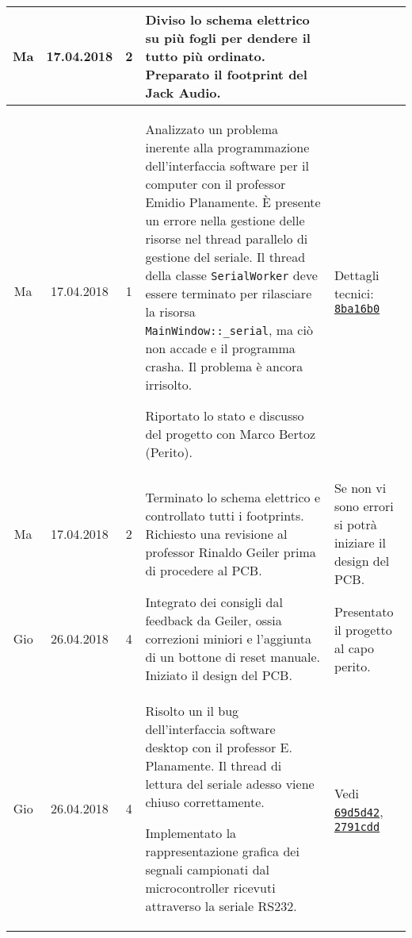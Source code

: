 \documentclass[a4paper]{article}
\newcommand{\journalentry}[5]{%
    #1 & #2 & #3 & #4 & #5 \\\hline
}
\begin{document}
\begin{tabularx}{\textwidth}{| c | c | c | p{} | X |}
        \journalentry{Ma}{17.04.2018}{2}{
            Diviso lo schema elettrico su pi\`u fogli per dendere il tutto pi\`u
            ordinato. Preparato il footprint del Jack Audio.
        }{}

        \journalentry{Ma}{17.04.2018}{1}{
            Analizzato un problema inerente alla programmazione dell'interfaccia
            software per il computer con il professor Emidio Planamente.
            \`E presente un errore nella gestione delle risorse nel thread
            parallelo di gestione del seriale. Il thread della classe 
            \texttt{SerialWorker} deve essere terminato per rilasciare la
            risorsa \texttt{MainWindow::\_serial}, ma ci\`o non accade e il 
            programma crasha. Il problema \`e ancora irrisolto.

            Riportato lo stato e discusso del progetto con Marco Bertoz (Perito).
        }{
            Dettagli tecnici:
            \href{https://github.com/NaoPross/SAMSpectrumAnalyzer/commit/8ba16b0f28e1724b825c14b6c3788319a617a718}{\texttt{8ba16b0}}
        }

        \journalentry{Ma}{17.04.2018}{2}{
            Terminato lo schema elettrico e controllato tutti i footprints.
            Richiesto una revisione al professor Rinaldo Geiler prima di 
            procedere al PCB.
        }{
            Se non vi sono errori si potr\`a iniziare il design del PCB.
        }


        \journalentry{Gio}{26.04.2018}{4}{
            Integrato dei consigli dal feedback da Geiler, ossia correzioni
            miniori e l'aggiunta di un bottone di reset manuale.
            Iniziato il design del PCB.
        }{
            Presentato il progetto al capo perito.
        }

        \journalentry{Gio}{26.04.2018}{4}{
            Risolto un il bug dell'interfaccia software desktop con il professor
            E. Planamente. Il thread di lettura del seriale adesso viene chiuso
            correttamente.

            Implementato la rappresentazione grafica dei segnali campionati
            dal microcontroller ricevuti attraverso la seriale RS232.
        }{
            Vedi
            \href{https://github.com/NaoPross/SAMSpectrumAnalyzer/commit/69d5d425552a9eecee7f168bfa8912061e4dd876}{\texttt{69d5d42}},
            \href{https://github.com/NaoPross/SAMSpectrumAnalyzer/commit/2791cdd30ab13738704171205abc46ea239e9e02}{\texttt{2791cdd}}
        }


\end{tabularx}
\end{document}
